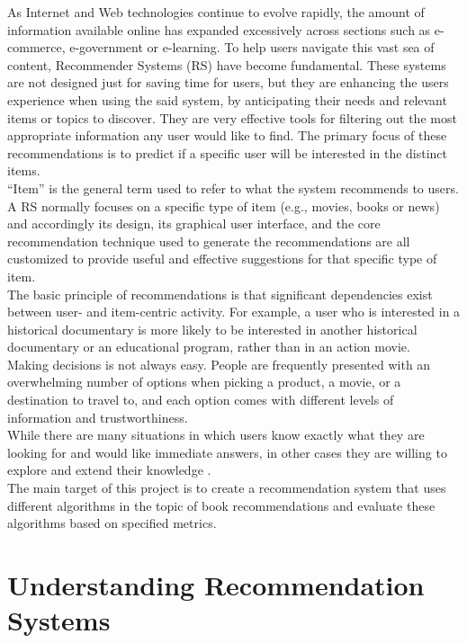 \documentclass[\myFontSize,a4paper,oneside,hidelinks]{article}
\begin{document}
As Internet and Web technologies continue to evolve rapidly, the amount of information available online has expanded excessively across sections such as e-commerce, e-government or e-learning. To help users navigate this vast sea of content, Recommender Systems (RS) have become fundamental. These systems are not designed just for saving time for users, but they are enhancing the users experience when using the said system, by anticipating their needs and relevant items or topics to discover. They are very effective tools for filtering out the most appropriate information any user would like to find. The primary focus of these recommendations is to predict if a specific user will be interested in the distinct items.\\
%
“Item” is the general term used to refer to what the system recommends to users. A RS normally focuses on a specific type of item (e.g., movies, books or news) and accordingly its design, its graphical user interface, and the core recommendation technique used to generate the recommendations are all customized to provide useful and effective suggestions for that specific type of item. \cite{pub.1036183961}\\
%
The basic principle of recommendations is that significant dependencies exist between user- and item-centric activity. 
For example, a user who is interested in a historical documentary is more likely to be interested in another historical documentary or an educational program, rather than in an action movie. \cite{pub.1022525812}\\
%
Making decisions is not always easy. People are frequently presented with an overwhelming number of options when picking a product, a movie, or a destination to travel to, and each option comes with different levels of information and trustworthiness. \\
While there are many situations in which users know exactly what they are looking for and would like immediate answers, in other cases they are willing to explore and extend their knowledge \cite{Blanco201333}.\\
%
The main target of this project is to create a recommendation system that uses different algorithms in the topic of  book recommendations and evaluate these algorithms based on specified metrics.\\





\clearpage{}
\section{Understanding Recommendation Systems}
\end{document}
